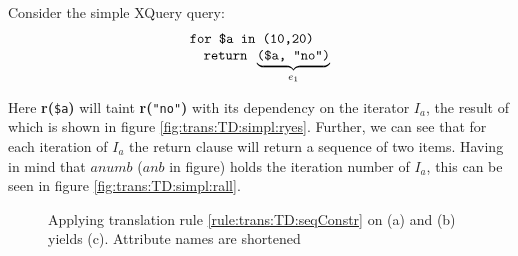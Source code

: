 \noindent
\begin{myExample}
Consider the simple XQuery query:
\begin{equation*}
\begin{array}{l}
\mbox{\texttt{for \$a in (10,20)}} \\ \quad
\mbox{\texttt{return }} \underbrace{ \mbox{\texttt{(\$a, "no")}} }_{e_{1}}
\end{array}
\end{equation*}

Here \textbf{r(}\texttt{\$a}\textbf{)} will taint \textbf{r(}\texttt{"no"}\textbf{)} with its dependency on the
iterator $I_{a}$, the result of which is shown in figure \ref{fig:trans:TD:simpl:ryes}. Further, we can see that
for each iteration of $I_{a}$ the return clause will return a sequence of two items. Having in mind that $anumb$
($anb$ in figure) holds the iteration number of $I_{a}$, this can be seen in figure \ref{fig:trans:TD:simpl:rall}.

\begin{figure}[!h]
\centering
{}
\qquad
{}
\qquad
{}

\caption[Example: constructing a sequence]{Applying translation rule \ref{rule:trans:TD:seqConstr} on (a) and (b)
yields (c). Attribute names are shortened \label{fig:trans:TD:simpleSeq}}
\end{figure}


\end{myExample}

